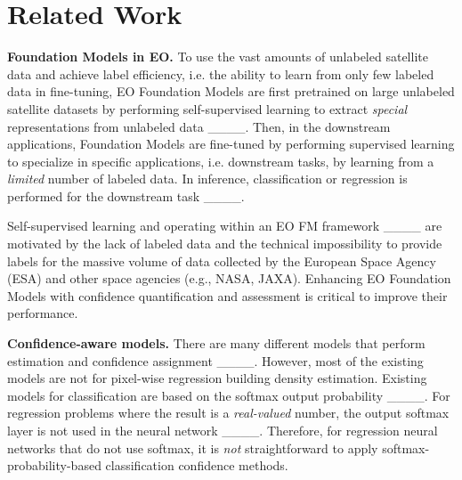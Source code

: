 \section{Related Work}
\noindent \textbf{Foundation Models in EO.} To use the vast amounts of unlabeled satellite data and achieve label efficiency, i.e. the ability to learn from only few labeled data in fine-tuning, EO Foundation Models are first pretrained on large unlabeled satellite datasets by performing self-supervised learning to extract \textit{special} representations from unlabeled data ____. 
Then, in the downstream applications, Foundation Models are fine-tuned by performing supervised learning to specialize in specific applications, i.e. downstream tasks, by learning from a \textit{limited} number of labeled data.
In inference, classification or regression is performed for the downstream task ____.



\iffalse   
Such tasks that are “downstream” from EO data require the acquisition of labels.  
Also, because Earth is dynamic, labels \textit{change} over time.

and having annotations for a geographical region at a specific point in time 
is not enough. 
\fi 

Self-supervised learning and operating within an EO FM framework ____ are motivated by the lack of labeled data and the technical impossibility to provide labels for the massive volume of data collected by the European Space Agency (ESA) and other space agencies (e.g., NASA, JAXA). 
Enhancing EO Foundation Models with confidence quantification and assessment is critical to improve their performance. 






\textbf{Confidence-aware models.}   
\noindent There are many different models that perform estimation and confidence assignment ____. However, most of the existing models are not for pixel-wise regression building density estimation. Existing models for classification are based on the softmax output probability ____.    
For regression problems where the result is a \textit{real-valued} number, the output softmax layer is not used in the neural network ____.               
Therefore, for regression neural networks that do not use softmax, it is \textit{not} straightforward to apply softmax-probability-based classification confidence methods.

